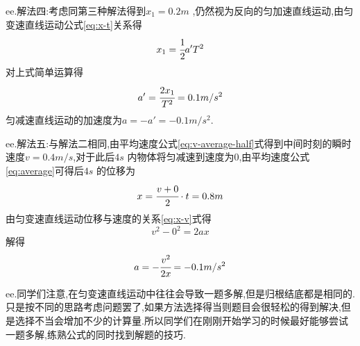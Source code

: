 \begin{calculate}
  ee.解法四:考虑同第三种解法得到$x_1=0.2m$ ,仍然视为反向的匀加速直线运动,由匀变速直线运动公式\eqref{eq:x-t}关系得
  $$x_1=\cfrac{1}{2}a'T^2$$
  对上式简单运算得
  $$a'=\cfrac{2x_1}{T^2}=0.1m/s^2$$
  匀减速直线运动的加速度为$a=-a'=-0.1m/s^2$.

  ee.解法五:与解法二相同,由平均速度公式\eqref{eq:v-average-half}式得到中间时刻的瞬时速度$v=0.4m/s$,对于此后$4s$ 内物体将匀减速到速度为$0$,由平均速度公式\eqref{eq:average}可得后$4s$ 的位移为
  $$x=\cfrac{v+0}{2}\cdot t =0.8m$$
  由匀变速直线运动位移与速度的关系\eqref{eq:x-v}式得
  $$v^2-0^2=2ax$$
  解得
  $$a=-\cfrac{v^2}{2x}=-0.1m/s^2$$

  ee.同学们注意,在匀变速直线运动中往往会导致一题多解,但是归根结底都是相同的.只是按不同的思路考虑问题罢了,如果方法选择得当则题目会很轻松的得到解决,但是选择不当会增加不少的计算量.所以同学们在刚刚开始学习的时候最好能够尝试一题多解,练熟公式的同时找到解题的技巧.

  

\end{calculate}
